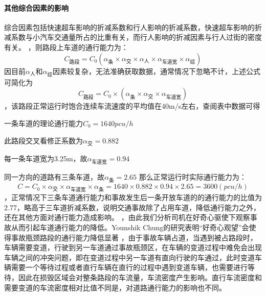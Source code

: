 \documentclass[UTF8,12.05pt]{ctexart}
\begin{document}
\paragraph{其他综合因素的影响}
综合因素包括快速超车影响的折减系数和行人影响的折减系数，快速超车影响的折减系数与小汽车交通量所占的比重有关，而行人影响的折减因素与行人过街的密度有关。
\newline
{}，则路段上车道的通行能力为：
$$C_{\text{路段}}=C_{0}(\alpha_{\text{条}}\times\alpha_{\text{交}}\times\alpha_{\text{人}}\times\alpha_{\text{车道宽}}\times\alpha_{\text{综}})$$
因目前$\alpha_{\text{人}}$和$\alpha_{\text{综}}$因素较复杂，无法准确获取数据，通常情况下忽略不计，上述公式可简化为
$$C_{\text{路段}}=C_{0}\times(\alpha_{\text{条}}\times\alpha_{\text{交}}\times\alpha_{\text{车道宽}})$$
，该路段正常运行时饱合连续车流速度的平均值在40m/s左右，查阅表中数据可得
\par 一条车道的理论通行能力$C_{0}=1640pcu/h$
\par 此路段交叉看修正系数为$\alpha_{\text{交}}=0.882$
\par 每一条车道宽为3.25m，故$\alpha_{\text{车道宽}}=0.94$
\par 同一方向的道路有三条车道，故$\alpha_{\text{条}}=2.65$
那么正常运行时实际通行能力为：
$$C=C_{0}\times\alpha_{\text{交}}\times\alpha_{\text{车道宽}}\times\alpha_{\text{条}}=1640\times0.882\times0.94\times2.65=3600(pcu/h)$$
，正常情况下三条车道通行能力和事故发生后一条开放车道的的通行能力的比值为2.77，略高于三车道折减系数，说明交通事故除了占用车道，降低通行能力之外，还在其他方面对通行能力造成影响。
，由此我们分析司机在好奇心驱使下观察事故从而引起车道通行能力的降低。Younshik Chung\cite{curiosity}的研究表明“好奇心观望”会使得事故瓶颈路段的通行能力降低显著
，由于事故车辆占道，当遇到被占路段时，车辆需要变道，行驶到另一车道通过事故瓶颈区，在车辆的变道过程中难免会出现车辆之间的冲突问题，即在变道过程中另一车道有直向行驶的车通过，此时变道车辆需要一个等待过程或者直行车辆在直行的过程中遇到变道车辆，也需要进行等待，因此在损毁区域会对整条路段的车流量，车流密度产生影响。直行车流密度和需要变道的车流密度相对比值不同是，对道路通行能力的影响也不同。
\end{document}
